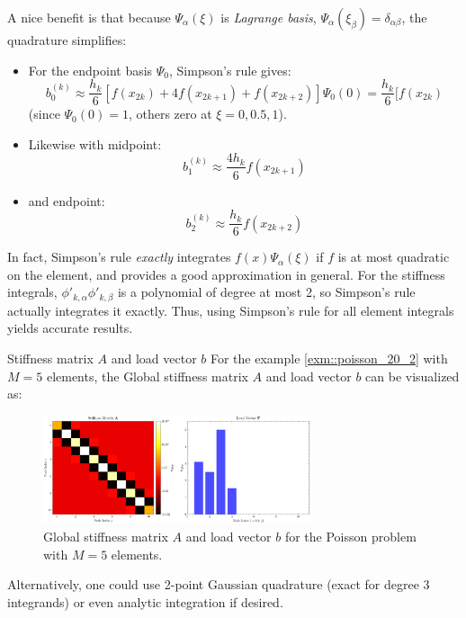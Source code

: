 \documentclass[a4paper,10pt]{article}
\begin{document}
A nice benefit is that because \(\Psi_\alpha(\xi)\) is \emph{Lagrange basis}, \(\Psi_{\alpha}(\xi_\beta) = \delta_{\alpha\beta}\), the quadrature simplifies:

\begin{itemize}
	\item For the endpoint basis \(\Psi_0\), Simpson's rule gives:
	\[
	b^{(k)}_0 \approx \frac{h_k}{6}[f(x_{2k}) + 4f(x_{2k+1}) + f(x_{2k+2})] \Psi_0(0) = \frac{h_k}{6}[f(x_{2k})
	\] 
	(since \(\Psi_0(0)=1\), others zero at \(\xi=0,0.5,1\)).
	\item Likewise with midpoint:
	\[
	b^{(k)}_1 \approx \frac{4h_k}{6} f(x_{2k+1})
	\]
	\item and endpoint:
	\[
	b^{(k)}_2 \approx \frac{h_k}{6} f(x_{2k+2}) 	
	\]
\end{itemize}

In fact, Simpson's rule \emph{exactly} integrates \(f(x)\Psi_\alpha(\xi)\) if \(f\) is at most quadratic on the element, and provides a good approximation in general.
For the stiffness integrals, \(\phi'_{k,\alpha}\phi'_{k,\beta}\) is a polynomial of degree at most 2, so Simpson's rule actually integrates it exactly.
Thus, using Simpson's rule for all element integrals yields accurate results.
\begin{example}{Stiffness matrix \(A\) and load vector \(b\)}{}
	For the example \ref{exm::poisson_20_2} with \(M=5\) elements, the Global stiffness matrix \(A\) and load vector \(b\) can be visualized as:
	\begin{figure}[H]
		\centering
		\includegraphics[width=0.7\textwidth]{figures/stiffness_matrix_and_load_vector_5_test.png}
		\caption{Global stiffness matrix \(A\) and load vector \(b\) for the Poisson problem with \(M=5\) elements.}
	\end{figure}
\end{example}

Alternatively, one could use 2-point Gaussian quadrature (exact for degree 3 integrands) or even analytic integration if desired.
\end{document}
